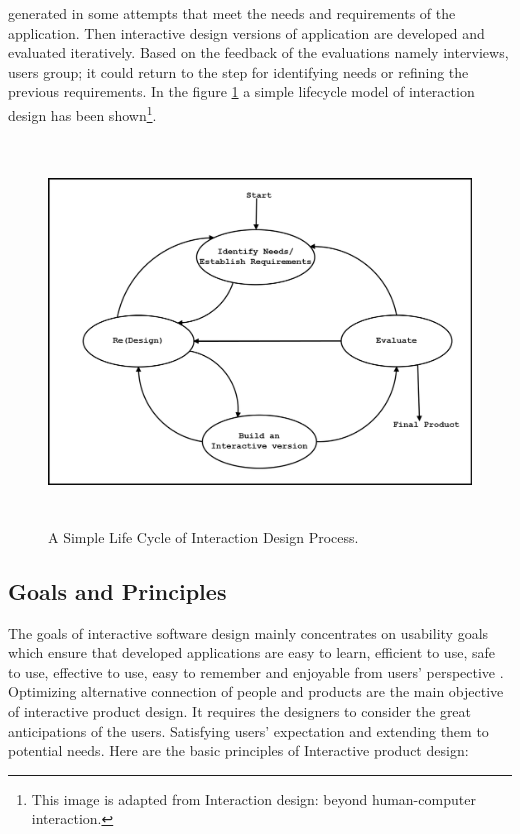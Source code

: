 generated in some attempts that meet the needs and requirements of the
application. Then interactive design versions of application are developed and
evaluated iteratively. Based on the feedback of the evaluations namely
interviews, users group;  it could return to the step for identifying needs or
refining the previous requirements. In the figure \ref{fig:SimpleLifeCycleID} a
simple lifecycle model of interaction design has been shown\footnote{This image
is adapted from Interaction design: beyond human-computer interaction.}.
\begin{figure}[h!t]
    \centering
      \includegraphics[width=5.5in,height=4in]{ch2/SimpleLifeCycleID}
  \caption{A Simple Life Cycle of Interaction Design Process.}
  \label{fig:SimpleLifeCycleID}
\end{figure}

\subsection{Goals and Principles}
The goals of interactive software design mainly concentrates on usability goals
which ensure that developed applications are easy to learn, efficient to use,
safe to use, effective to use, easy to remember and enjoyable from users'
perspective \cite{preece2002interaction}.
Optimizing alternative connection of people and products are the main objective
of interactive product design. It requires the designers to consider the great
anticipations of the users. Satisfying users' expectation and extending them
to potential needs. Here are the basic principles \cite{Yang2009} of Interactive
product design:

